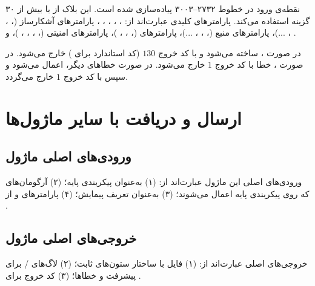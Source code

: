 نقطه‌ی ورود  در خطوط ۲۷۳۲–۳۰۰۳ پیاده‌سازی شده است. این بلاک از  با بیش از ۳۰ گزینه استفاده می‌کند. پارامترهای کلیدی عبارت‌اند از: ، ، ، ، ، پارامترهای آشکارساز (، ، ، ...)، پارامترهای منبع (، ، ، ...)، پارامترهای  (، ، ، )، پارامترهای امنیتی (، ، ، ، )، و .

در صورت ،  ساخته می‌شود و با کد خروج $130$ (کد استاندارد  برای ) خارج می‌شود. در صورت ، خطا با کد خروج $1$ خارج می‌شود. در صورت خطاهای دیگر،  اعمال می‌شود و سپس با کد خروج $1$ خارج می‌گردد.

\section{ارسال و دریافت با سایر ماژول‌ها}

\subsection{ورودی‌های اصلی ماژول}

ورودی‌های اصلی این ماژول عبارت‌اند از: (۱)  به‌عنوان پیکربندی پایه؛ (۲) آرگومان‌های  که روی پیکربندی پایه اعمال می‌شوند؛ (۳)  به‌عنوان  تعریف پیمایش؛ (۴) پارامترهای  و  از .

\subsection{خروجی‌های اصلی ماژول}

خروجی‌های اصلی عبارت‌اند از: (۱) فایل  با ساختار ستون‌های ثابت؛ (۲) لاگ‌های / برای پیشرفت و خطاها؛ (۳) کد خروج  برای .

